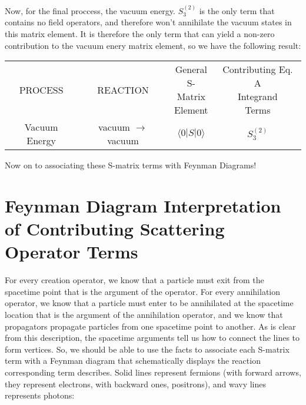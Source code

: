 \documentclass[a4]{article}
\begin{document}
    Now, for the final proccess, the vacuum energy. $S^{(2)}_{3}$ is the only term that contains no field operators, and therefore won't annihilate the
    vacuum states in this matrix element. It is therefore the only term that can yield a non-zero contribution to the vacuum enery matrix element, so we
    have the following result:

    \begin{framed}
        \begin{tabular}{c c c c}
            PROCESS & REACTION & \shortstack{General \\ S-Matrix \\ Element} & \shortstack{Contributing Eq. A \\ Integrand \\ Terms} \\
            Vacuum Energy & vacuum $\rightarrow$ vacuum & $\langle 0 | S | 0 \rangle$ & $S^{(2)}_{3}$
        \end{tabular}
    \end{framed}

    Now on to associating these S-matrix terms with Feynman Diagrams!

    \section{Feynman Diagram Interpretation of Contributing Scattering Operator Terms}

    For every creation operator, we know that a particle must exit from the spacetime point that is the argument of the operator. For every annihilation
    operator, we know that a particle must enter to be annihilated at the spacetime location that is the argument of the annihilation operator, and we
    know that propagators propagate particles from one spacetime point to another. As is clear from this description, the spacetime arguments tell us how
    to connect the lines to form vertices. So, we should be able to use the facts to associate each S-matrix term with a Feynman diagram that schematically
    displays the reaction corresponding term describes. Solid lines represent fermions (with forward arrows, they represent electrons, with backward ones,
    positrons), and wavy lines represents photons: 

    \hspace{0.25cm}
\end{document}
